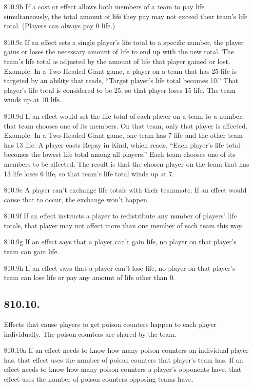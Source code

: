 810.9b If a cost or effect allows both members of a team to pay life simultaneously, the total amount of life they pay may not exceed their team’s life total. (Players can always pay 0 life.)

810.9c If an effect sets a single player’s life total to a specific number, the player gains or loses the necessary amount of life to end up with the new total. The team’s life total is adjusted by the amount of life that player gained or lost.
Example: In a Two-Headed Giant game, a player on a team that has 25 life is targeted by an ability that reads, “Target player’s life total becomes 10.” That player’s life total is considered to be 25, so that player loses 15 life. The team winds up at 10 life.

810.9d If an effect would set the life total of each player on a team to a number, that team chooses one of its members. On that team, only that player is affected.
Example: In a Two-Headed Giant game, one team has 7 life and the other team has 13 life. A player casts Repay in Kind, which reads, “Each player’s life total becomes the lowest life total among all players.” Each team chooses one of its members to be affected. The result is that the chosen player on the team that has 13 life loses 6 life, so that team’s life total winds up at 7.

810.9e A player can’t exchange life totals with their teammate. If an effect would cause that to occur, the exchange won’t happen.

810.9f If an effect instructs a player to redistribute any number of players’ life totals, that player may not affect more than one member of each team this way.

810.9g If an effect says that a player can’t gain life, no player on that player’s team can gain life.

810.9h If an effect says that a player can’t lose life, no player on that player’s team can lose life or pay any amount of life other than 0.

\subsection*{810.10.}
Effects that cause players to get poison counters happen to each player individually. The poison counters are shared by the team.

810.10a If an effect needs to know how many poison counters an individual player has, that effect uses the number of poison counters that player’s team has. If an effect needs to know how many poison counters a player’s opponents have, that effect uses the number of poison counters opposing teams have.

